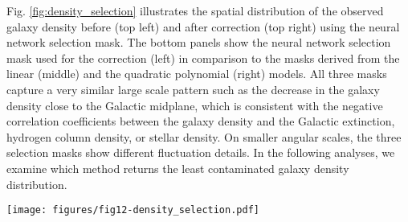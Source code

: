 Fig. \ref{fig:density_selection} illustrates the spatial distribution of the observed galaxy density before (top left) and after correction (top right) using the neural network selection mask. The bottom panels show the neural network selection mask used for the correction (left) in comparison to the masks derived from the linear (middle) and the quadratic polynomial (right) models. All three masks capture a very similar large scale pattern such as the decrease in the galaxy density close to the Galactic midplane, which is consistent with the negative correlation coefficients between the galaxy density and the Galactic extinction, hydrogen column density, or stellar density. On smaller angular scales, the three selection masks show different fluctuation details. In the following analyses, we examine which method returns the least contaminated galaxy density distribution. \\

\begin{figure*}
    \centering
    \texttt{[image: figures/fig12-density\_selection.pdf]}
    \caption{\textit{Top}: The normalized observed galaxy density of  DR7 before and after systematics treatment using the neural network selection mask, respectively, from left to right. \textit{Bottom}: the selection masks from the Neural Network, quadratic, and linear polynomial models, respectively from left to right. All three selection masks are able to capture the behavior that the galaxy density systematically drops at the footprint boundaries i.e., high extinction regions.}
    \label{fig:density_selection}
\end{figure*}


